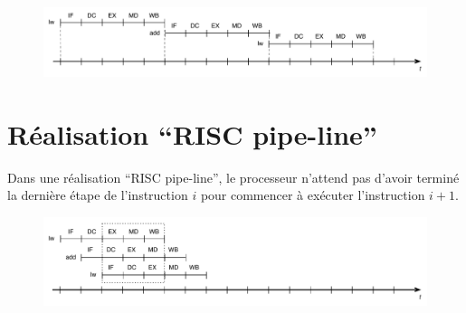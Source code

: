 \documentclass[11pt,english,french]{scrreprt}
\theoremstyle{remark}
\theoremstyle{definition}
\begin{document}
\begin{figure}[!h]
	\center
	\includegraphics[scale=.60]{diagrammes/monoprogrammee}
\end{figure}

\section{Réalisation ``RISC pipe-line''} %
Dans une réalisation ``RISC pipe-line'', le processeur n'attend pas d'avoir terminé la dernière étape de l'instruction $i$ pour commencer à exécuter l'instruction $i+1$.

\begin{figure}[!h]
	\center
	\includegraphics[scale=.60]{diagrammes/RISC-pipe-line}
\end{figure}

\clearpage
\end{document}
